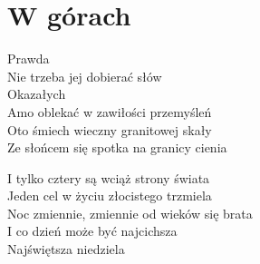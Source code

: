 \section{W górach}
\begin{text}
Prawda\\
Nie trzeba jej dobierać słów\\
Okazałych\\
Amo oblekać w zawiłości przemyśleń\\
Oto śmiech wieczny granitowej skały\\
Ze słońcem się spotka na granicy cienia

I tylko cztery są wciąż strony świata\\
Jeden cel w życiu złocistego trzmiela\\
Noc zmiennie, zmiennie od wieków się brata\\
I co dzień może być najcichsza\\
Najświętsza niedziela
\end{text}
